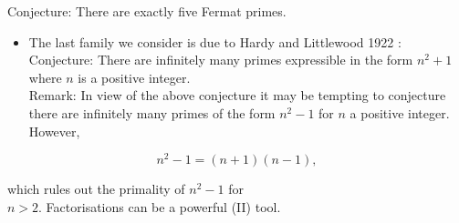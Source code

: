 \documentclass[10pt]{article}
\begin{document}
Conjecture: There are exactly five Fermat primes.

\begin{itemize}
  \item The last family we consider is due to Hardy and Littlewood 1922 :\\
Conjecture: There are infinitely many primes expressible in the form $n^{2}+1$ where $n$ is a positive integer.\\
Remark: In view of the above conjecture it may be tempting to conjecture there are infinitely many primes of the form $n^{2}-1$ for $n$ a positive integer. However,
\end{itemize}

$$
n^{2}-1=(n+1)(n-1),
$$

which rules out the primality of $n^{2}-1$ for\\
$n>2$. Factorisations can be a powerful (II) tool.
\end{document}
